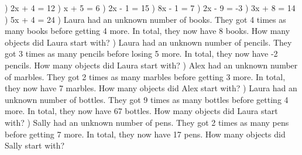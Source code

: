 \documentclass{article}%
\begin{document}
\newline%
) 2x + 4 = 12%
\newline%
\newline%
) x + 5 = 6%
\newline%
\newline%
) 2x - 1 = 15%
\newline%
\newline%
) 8x - 1 = 7%
\newline%
\newline%
) 2x - 9 = -3%
\newline%
\newline%
) 3x + 8 = 14%
\newline%
\newline%
) 5x + 4 = 24%
\newline%
\newline%
) Laura had an unknown number of books. They got 4 times as many books before getting 4 more. In total, they now have 8 books. How many objects did Laura start with?%
\newline%
\newline%
) Laura had an unknown number of pencils. They got 3 times as many pencils before losing 5 more. In total, they now have -2 pencils. How many objects did Laura start with?%
\newline%
\newline%
) Alex had an unknown number of marbles. They got 2 times as many marbles before getting 3 more. In total, they now have 7 marbles. How many objects did Alex start with?%
\newline%
\newline%
) Laura had an unknown number of bottles. They got 9 times as many bottles before getting 4 more. In total, they now have 67 bottles. How many objects did Laura start with?%
\newline%
\newline%
) Sally had an unknown number of pens. They got 2 times as many pens before getting 7 more. In total, they now have 17 pens. How many objects did Sally start with?%
\end{document}
